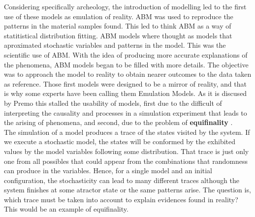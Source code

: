 \documentclass[11pt,oneside,a4paper,openright]{report}
\begin{document}
Considering specifically archeology, the introduction of modelling led to the first use of these models as emulation of reality. ABM was used to reproduce the patterns in the material samples found. This led to think ABM as a way of statitistical distribution fitting. ABM models where thought as models that aproximated stochastic variables and patterns in the model. This was the scientific use of ABM. With the idea of producing more accurate explanations of the phenomena, ABM models began to be filled with more details. The objective was to approach the model to reality to obtain nearer outcomes to the data taken as reference. Those first models were designed to be a mirror of reality, and that is why some experts have been calling them Emulation Models. As it is discused by Premo \cite{Premo2010_pg33} this stalled the usability of models, first due to the difficult of interpreting the causality and processes in a simulation experiment that leads to the arising of phenomena, and second, due to the problem of \textbf{equifinality} \cite{Premo2010_EQF}.\\
The simulation of a model produces a trace of the states visited by the system. If we execute a stochastic model, the states will be conformed by the exhibited values by the model variables following some distribution. That trace is just only one from all possibles that could appear from the combinations that randomness can produce in the variables. Hence, for a single model and an initial configuration, the stochasticity can lead to many different traces although the system finishes at some atractor state or the same patterns arise. The question is, which trace must be taken into account to explain evidences found in reality? This would be an example of equifinality.\\ 
%
\end{document}
